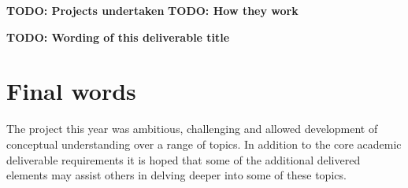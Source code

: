 \documentclass{article}
\begin{document}
\textbf{TODO: Projects undertaken}
\textbf{TODO: How they work}



\textbf{TODO: Wording of this deliverable title}
\section*{Final words}
The project this year was ambitious, challenging and allowed development of conceptual understanding over a range of topics. In addition to the core academic deliverable requirements it is hoped that some of the additional delivered elements may assist others in delving deeper into some of these topics.


\end{document}
